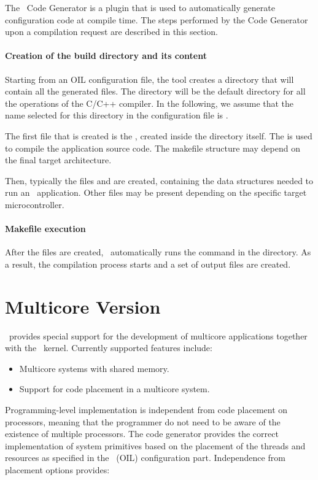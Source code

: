 The \rtd\ Code Generator is a plugin that is used to automatically
generate configuration code at compile time. The steps performed by
the Code Generator upon a compilation request are described in this 
section.

\paragraph{Creation of the build directory and its content}
Starting from an OIL configuration file, the tool creates a directory
that will contain all the generated files. The directory will be the
default directory for all the operations of the C/C++ compiler. In the
following, we assume that the name selected for this directory in the
configuration file is .

The first file that is created is the , created inside
the  directory itself. The  is used to
compile the application source code. The makefile structure may depend
on the final target architecture.

Then, typically the files  and  are
created, containing the data structures needed to run an
\ee\ application. Other files may be present depending on the specific
target microcontroller.

\paragraph{Makefile execution}
After the files are created, \rtd\ automatically runs the 
command in the  directory. As a result, the compilation
process starts and a set of output files are created.

\section{Multicore Version}

\rtd\ provides special support for the development of multicore
applications together with the \ee\ kernel. Currently
supported features include:

\begin{itemize}
\item Multicore systems with shared memory.
\item Support for code placement in a multicore system.
\end{itemize}

Programming-level implementation is independent from code placement on
processors, meaning that the programmer do not need to be aware of the
existence of multiple processors. The code generator provides the
correct implementation of system primitives based on the placement of
the threads and resources as specified in the \rtd\ (OIL)
configuration part. Independence from placement options provides:

